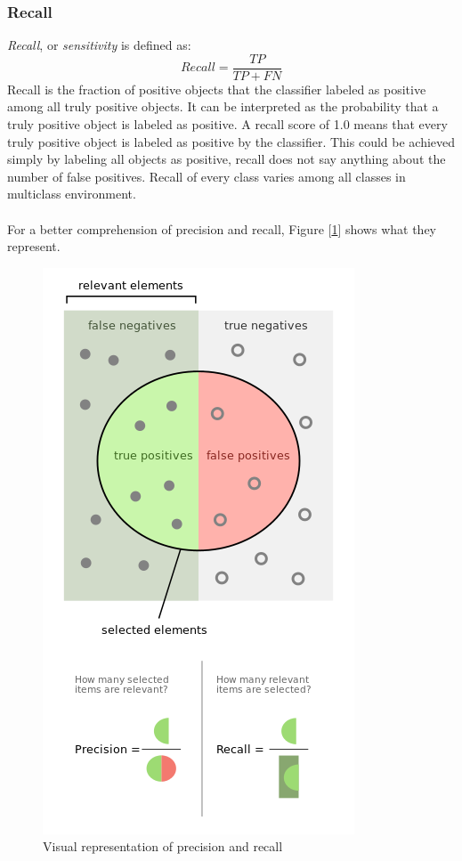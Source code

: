 \documentclass[11pt]{article}
\begin{document}
      \subsubsection{Recall}
        {\it Recall}, or {\it sensitivity} \cite{confusion} is defined as:
        \begin{equation}
          Recall = \frac{TP}{TP + FN}
        \end{equation}
        Recall is the fraction of positive objects that the classifier labeled as positive among all truly positive objects. It can be interpreted as the probability that a truly positive object is labeled as positive. A recall score of 1.0 means that every truly positive object is labeled as positive by the classifier. This could be achieved simply by labeling all objects as positive, recall does not say anything about the number of false positives. Recall of every class varies among all classes in multiclass environment.
    \\~\\
    For a better comprehension of precision and recall, Figure [\ref{figure:precrec}] shows what they represent.
    \begin{figure}
      \centering
      \caption{Visual representation of precision and recall \cite{precrec}}
      \label{figure:precrec}
      \includegraphics[scale=0.8]{thesis_res/precrec.png}
    \end{figure}
    \newpage
\end{document}
